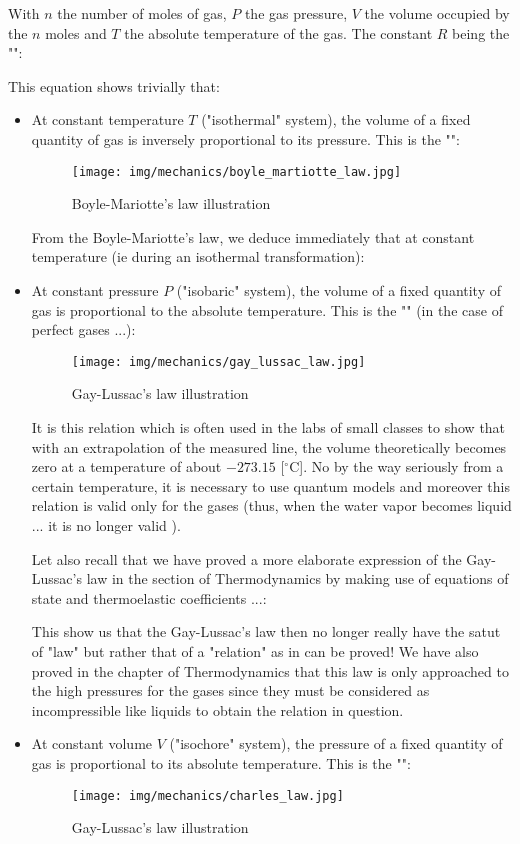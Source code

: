 	With $n$ the number of moles of gas, $P$ the gas pressure, $V$ the volume occupied by the $n$ moles and $T$ the absolute temperature of the gas. The constant $R$ being the "":
	
	This equation shows trivially that:
	\begin{itemize}
		\item At constant temperature $T$ ("isothermal" system), the volume of a fixed quantity of gas is inversely proportional to its pressure. This is the "":
		
		\begin{figure}[H]
			\centering
			\texttt{[image: img/mechanics/boyle\_martiotte\_law.jpg]}
			\caption{Boyle-Mariotte's law illustration}
		\end{figure}
		From the Boyle-Mariotte's law, we deduce immediately that at constant temperature (ie during an isothermal transformation):
		

		\item At constant pressure $P$ ("isobaric" system), the volume of a fixed quantity of gas is proportional to the absolute temperature. This is the "" (in the case of perfect gases ...):
		
		\begin{figure}[H]
			\centering
			\texttt{[image: img/mechanics/gay\_lussac\_law.jpg]}
			\caption{Gay-Lussac's law illustration}
		\end{figure}
		It is this relation which is often used in the labs of small classes to show that with an extrapolation of the measured line, the volume theoretically becomes zero at a temperature of about $-273.15$ [$^\circ$C]. No by the way seriously from a certain temperature, it is necessary to use quantum models and moreover this relation is valid only for the gases (thus, when the water vapor becomes liquid ... it is no longer valid ).
		
		Let also recall that we have proved a more elaborate expression of the Gay-Lussac's law in the section of Thermodynamics by making use of equations of state and thermoelastic coefficients ...:
		
		This show us that the Gay-Lussac's law then no longer really have the satut of "law" but rather that of a "relation" as in can be proved! We have also proved in the chapter of Thermodynamics that this law is only approached to the high pressures for the gases since they must be considered as incompressible like liquids to obtain the relation in question.
		
		\item At constant volume $V$ ("isochore" system), the pressure of a fixed quantity of gas is proportional to its absolute temperature. This is the "":
		
		\begin{figure}[H]
			\centering
			\texttt{[image: img/mechanics/charles\_law.jpg]}
			\caption{Gay-Lussac's law illustration}
		\end{figure}
	\end{itemize}
